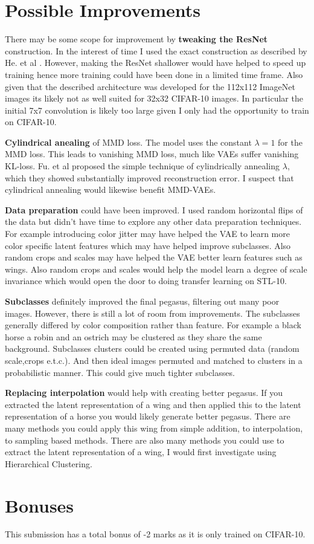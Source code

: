 \documentclass{article}
\begin{document}
\section{Possible Improvements}
There may be some scope for improvement by \textbf{tweaking the ResNet} construction. In the interest of time I used the exact construction as described by He. et al \cite{ResNet}. However, making the ResNet shallower would have helped to speed up training hence more training could have been done in a limited time frame. Also given that the described architecture was developed for the 112x112 ImageNet images its likely not as well suited for 32x32 CIFAR-10 images. In particular the initial 7x7 convolution is likely too large given I only had the opportunity to train on CIFAR-10.

\textbf{Cylindrical anealing} of MMD loss. The model uses the constant $\lambda=1$ for the MMD loss. This leads to vanishing MMD loss, much like VAEs suffer vanishing KL-loss. Fu. et al \cite{cylindricalAnnealing} proposed the simple technique of cylindrically annealing $\lambda$, which they showed substantially improved reconstruction error. I suspect that cylindrical annealing would likewise benefit MMD-VAEs.

\textbf{Data preparation} could have been improved. I used random horizontal flips of the data but didn't have time to explore any other data preparation techniques. For example introducing color jitter may have helped the VAE to learn more color specific latent features which may have helped improve subclasses. Also random crops and scales may have helped the VAE better learn features such as wings. Also random crops and scales would help the model learn a degree of scale invariance which would open the door to doing transfer learning on STL-10.  

\textbf{Subclasses} definitely improved the final pegasus, filtering out many poor images. However, there is still a lot of room from improvements. The subclasses generally differed by color composition rather than feature. For example a black horse a robin and an ostrich may be clustered as they share the same background. Subclasses clusters could be created using permuted data (random scale,crops e.t.c.). And then ideal images permuted and matched to clusters in a probabilistic manner. This could give much tighter subclasses.

\textbf{Replacing interpolation} would help with creating better pegasus. If you extracted the latent representation of a wing and then applied this to the latent representation of a horse you would likely generate better pegasus. There are many methods you could apply this wing from simple addition, to interpolation, to sampling based methods. There are also many methods you could use to extract the latent representation of a wing, I would first investigate using Hierarchical Clustering.


\section*{Bonuses}
This submission has a total bonus of -2 marks as it is only trained on CIFAR-10.

\printbibliography
\end{document}
